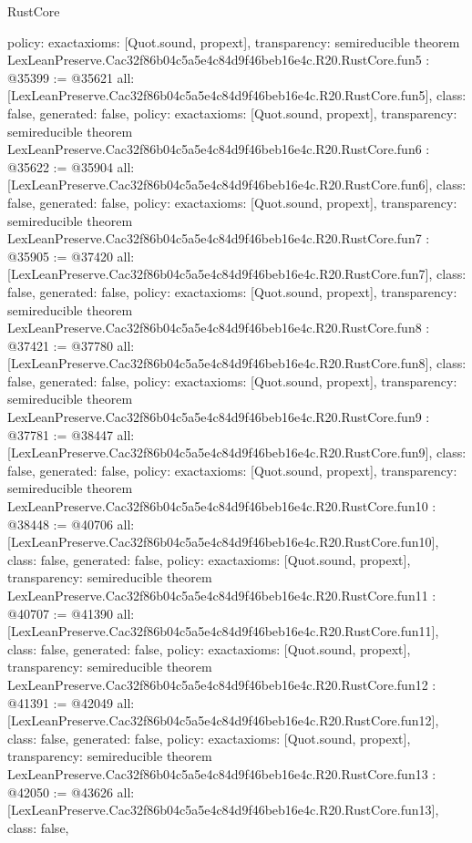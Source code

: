 \begin{lexlean}{RustCore}
\begin{coremodule}
{  policy: exact{axioms: [Quot.sound, propext]},
  transparency: semireducible
}
theorem LexLeanPreserve.Cac32f86b04c5a5e4c84d9f46beb16e4c.R20.RustCore.fun5 : @35399 := @35621 {
  all: [LexLeanPreserve.Cac32f86b04c5a5e4c84d9f46beb16e4c.R20.RustCore.fun5],
  class: false,
  generated: false,
  policy: exact{axioms: [Quot.sound, propext]},
  transparency: semireducible
}
theorem LexLeanPreserve.Cac32f86b04c5a5e4c84d9f46beb16e4c.R20.RustCore.fun6 : @35622 := @35904 {
  all: [LexLeanPreserve.Cac32f86b04c5a5e4c84d9f46beb16e4c.R20.RustCore.fun6],
  class: false,
  generated: false,
  policy: exact{axioms: [Quot.sound, propext]},
  transparency: semireducible
}
theorem LexLeanPreserve.Cac32f86b04c5a5e4c84d9f46beb16e4c.R20.RustCore.fun7 : @35905 := @37420 {
  all: [LexLeanPreserve.Cac32f86b04c5a5e4c84d9f46beb16e4c.R20.RustCore.fun7],
  class: false,
  generated: false,
  policy: exact{axioms: [Quot.sound, propext]},
  transparency: semireducible
}
theorem LexLeanPreserve.Cac32f86b04c5a5e4c84d9f46beb16e4c.R20.RustCore.fun8 : @37421 := @37780 {
  all: [LexLeanPreserve.Cac32f86b04c5a5e4c84d9f46beb16e4c.R20.RustCore.fun8],
  class: false,
  generated: false,
  policy: exact{axioms: [Quot.sound, propext]},
  transparency: semireducible
}
theorem LexLeanPreserve.Cac32f86b04c5a5e4c84d9f46beb16e4c.R20.RustCore.fun9 : @37781 := @38447 {
  all: [LexLeanPreserve.Cac32f86b04c5a5e4c84d9f46beb16e4c.R20.RustCore.fun9],
  class: false,
  generated: false,
  policy: exact{axioms: [Quot.sound, propext]},
  transparency: semireducible
}
theorem LexLeanPreserve.Cac32f86b04c5a5e4c84d9f46beb16e4c.R20.RustCore.fun10 : @38448 := @40706 {
  all: [LexLeanPreserve.Cac32f86b04c5a5e4c84d9f46beb16e4c.R20.RustCore.fun10],
  class: false,
  generated: false,
  policy: exact{axioms: [Quot.sound, propext]},
  transparency: semireducible
}
theorem LexLeanPreserve.Cac32f86b04c5a5e4c84d9f46beb16e4c.R20.RustCore.fun11 : @40707 := @41390 {
  all: [LexLeanPreserve.Cac32f86b04c5a5e4c84d9f46beb16e4c.R20.RustCore.fun11],
  class: false,
  generated: false,
  policy: exact{axioms: [Quot.sound, propext]},
  transparency: semireducible
}
theorem LexLeanPreserve.Cac32f86b04c5a5e4c84d9f46beb16e4c.R20.RustCore.fun12 : @41391 := @42049 {
  all: [LexLeanPreserve.Cac32f86b04c5a5e4c84d9f46beb16e4c.R20.RustCore.fun12],
  class: false,
  generated: false,
  policy: exact{axioms: [Quot.sound, propext]},
  transparency: semireducible
}
theorem LexLeanPreserve.Cac32f86b04c5a5e4c84d9f46beb16e4c.R20.RustCore.fun13 : @42050 := @43626 {
  all: [LexLeanPreserve.Cac32f86b04c5a5e4c84d9f46beb16e4c.R20.RustCore.fun13],
  class: false,
}
\end{coremodule}
\end{lexlean}
